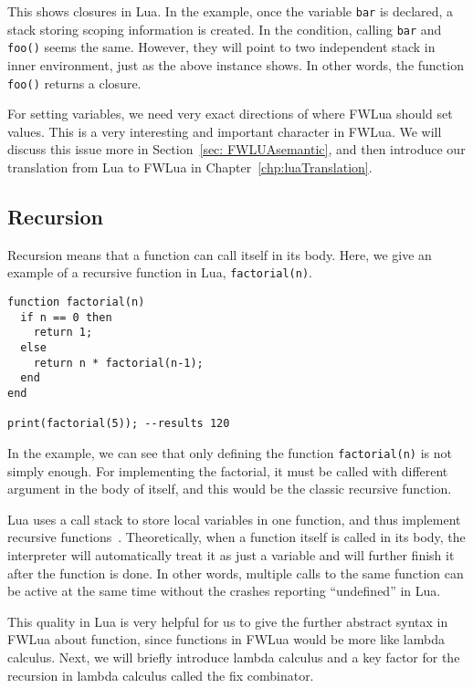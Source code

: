 This shows closures in Lua.
In the example, once the variable {\tt bar} is declared, a stack storing scoping information is created.
In the condition, calling {\tt bar} and {\tt foo()} seems the same. However, they will point to two independent stack in inner environment, just as the above instance shows. In other words, the function {\tt foo()} returns a closure.

For setting variables, we need very exact directions of where FWLua should set values. This is a very interesting and important character in FWLua. We will discuss this issue more in Section~\ref{sec: FWLUAsemantic}, and then introduce our translation from Lua to FWLua in Chapter~\ref{chp:luaTranslation}.

\subsection{Recursion}\label{sec:recursions}

Recursion means that a function can call itself in its body.
Here, we give an example of a recursive function in Lua, {\tt factorial(n)}.

\begin{verbatim}
function factorial(n)
  if n == 0 then
    return 1;
  else
    return n * factorial(n-1);
  end
end

print(factorial(5)); --results 120
\end{verbatim}

In the example, we can see that only defining the function {\tt factorial(n)} is not simply enough. For implementing the factorial, it must be called with different argument in the body of itself, and this would be the classic recursive function.

Lua uses a call stack to store local variables in one function, and thus implement recursive functions~\cite{begLua}. Theoretically, when a function itself is called in its body, the interpreter will automatically treat it as just a variable and will further finish it after the function is done. In other words, multiple calls to the same function can be active at the same time without the crashes reporting ``undefined'' in Lua.

This quality in Lua is very helpful for us to give the further abstract syntax in FWLua about function, since functions in FWLua would be more like lambda calculus. Next, we will briefly introduce lambda calculus and a key factor for the recursion in lambda calculus called the fix combinator.

